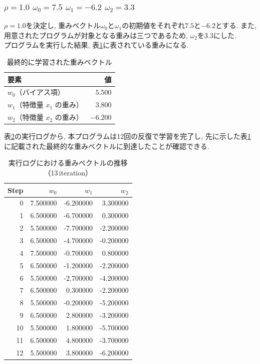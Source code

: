 \documentclass[a4j, 12pt]{jarticle}
\begin{document}
\subsubsection{$\rho=1.0$ $\omega_0=7.5$ $\omega_1=-6.2$ $\omega_2=3.3$}
$\rho=1.0$を決定し, 重みベクトル$\omega_0$と$\omega_1$の初期値をそれぞれ$7.5$と$-6.2$とする. また, 用意されたプログラムが対象となる重みは三つであるため, $\omega_2$を$3.3$にした. \\
プログラムを実行した結果, 表\ref{self1finalweights}に表されている重みになる. 
\begin{table}[H]
  \centering
  \caption{最終的に学習された重みベクトル}\label{self1finalweights}
  \begin{tabular}{l r}
    \hline
    要素 & 値 \\
    \hline
    $w_0$（バイアス項） & $5.500$ \\
    $w_1$（特徴量 $x_1$ の重み） & $3.800$ \\
    $w_2$（特徴量 $x_2$ の重み） & $-6.200$ \\
    \hline
  \end{tabular}
\end{table}
表\ref{self1logs}の実行ログから, 本プログラムは12回の反復で学習を完了し, 先に示した表\ref{self1finalweights}に記載された最終的な重みベクトルに到達したことが確認できる.
\begin{table}[H]
  \centering
  \caption{実行ログにおける重みベクトルの推移（13\,iteration）}\label{self1logs}
  \begin{tabular}{r|rrr}
  \hline
  Step & $w_0$ & $w_1$ & $w_2$ \\
  \hline
   0 &  7.500000 & -6.200000 &  3.300000 \\
   1 &  6.500000 & -6.700000 &  0.300000 \\
   2 &  5.500000 & -7.700000 & -2.200000 \\
   3 &  6.500000 & -4.700000 & -0.200000 \\
   4 &  7.500000 & -0.700000 &  0.800000 \\
   5 &  6.500000 & -1.200000 & -2.200000 \\
   6 &  5.500000 & -2.700000 & -4.200000 \\
   7 &  6.500000 &  0.300000 & -2.200000 \\
   8 &  5.500000 & -0.200000 & -5.200000 \\
   9 &  6.500000 &  2.800000 & -3.200000 \\
  10 &  5.500000 &  1.800000 & -5.700000 \\
  11 &  6.500000 &  4.800000 & -3.700000 \\
  12 &  5.500000 &  3.800000 & -6.200000 \\
  \hline
  \end{tabular}
\end{table}
\end{document}
